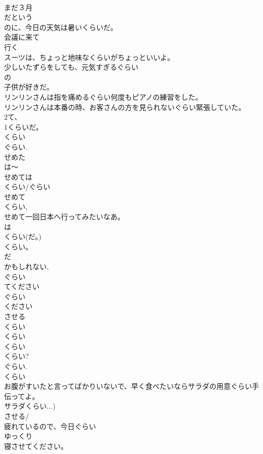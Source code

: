 \documentclass[8pt]{extreport}
\begin{document}
\begin{CJK}{UTF8}{min}
\\	まだ３月
\\	だという
\\	のに、今日の天気は暑いくらいだ。
\\	会議に来て
\\	行く
\\	スーツは、ちょっと地味なくらいがちょっといいよ。
\\	少しいたずらをしても、元気すぎるぐらい
\\	の
\\	子供が好きだ。
\\	リンリンさんは指を痛めるぐらい何度もピアノの練習をした。
\\	リンリンさんは本番の時、お客さんの方を見られないぐらい緊張していた。
\\	2て、
\\	1くらいだ。
\\	くらい
\\	ぐらい.
\\	せめた
\\	は～
\\	せめては
\\	くらい/ぐらい 
\\	せめて 
\\	くらい, 
\\	せめて一回日本へ行ってみたいなあ。
\\	は
\\	くらい(だ。)
\\	くらい。　
\\	だ 
\\	かもしれない, 
\\	ぐらい
\\	てください
\\	ぐらい
\\	ください
\\	させる 
\\	くらい
\\	くらい
\\	くらい
\\	くらい? 
\\	ぐらい.
\\	くらい
\\	お腹がすいたと言ってばかりいないで、早く食べたいならサラダの用意ぐらい手伝ってよ。
\\	サラダくらい...)
\\	させる/
\\	疲れているので、今日ぐらい
\\	ゆっくり
\\	寝させてください。

\end{CJK}
\end{document}
